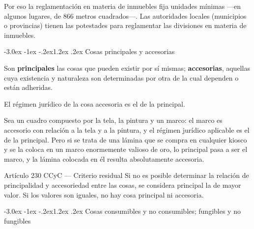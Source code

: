 \documentclass[12pt,oneside]{book}
\makeatletter
\renewcommand\section{\@startsection{section}{1}{\z@}%
  {-3.0ex \@plus -1ex \@minus -.2ex}{1.2ex \@plus .2ex}%
  {\normalfont\large\bfseries\color{acento}}}
\makeatother
\begin{document}
Por eso la reglamentación en materia de inmuebles fija unidades mínimas ---en algunos lugares, de 866 metros cuadrados---. Las autoridades locales (municipios o provincias) tienen las potestades para reglamentar las divisiones en materia de inmuebles.

\section{Cosas principales y accesorias}

\begin{definicion}
Son \textbf{principales} las cosas que pueden existir por sí mismas; \textbf{accesorias}, aquellas cuya existencia y naturaleza son determinadas por otra de la cual dependen o están adheridas.
\end{definicion}

El régimen jurídico de la cosa accesoria es el de la principal.

\begin{ejemplo}
Sea un cuadro compuesto por la tela, la pintura y un marco: el marco es accesorio con relación a la tela y a la pintura, y el régimen jurídico aplicable es el de la principal. Pero si se trata de una lámina que se compra en cualquier kiosco y se la coloca en un marco enormemente valioso de oro, lo principal pasa a ser el marco, y la lámina colocada en él resulta absolutamente accesoria.
\end{ejemplo}

\begin{norma}{Artículo 230 CCyC --- Criterio residual}
Si no es posible determinar la relación de principalidad y accesoriedad entre las cosas, se considera principal la de mayor valor. Si los valores son iguales, no hay cosa principal ni accesoria.
\end{norma}

\section{Cosas consumibles y no consumibles; fungibles y no fungibles}
\end{document}
